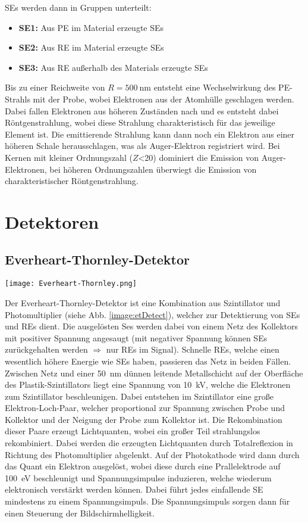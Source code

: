 SEs werden dann in Gruppen unterteilt:
\begin{itemize}
    \item \textbf{SE1:} Aus PE im Material erzeugte SEs
    \item \textbf{SE2:} Aus RE im Material erzeugte SEs 
    \item \textbf{SE3:} Aus RE außerhalb des Materials erzeugte SEs\\   
\end{itemize}

Bis zu einer Reichweite von $R=\SI{500}{\nano\metre}$ entsteht eine Wechselwirkung des PE-Strahls mit der Probe, wobei Elektronen aus der Atomhülle geschlagen werden. Dabei fallen Elektronen aus höheren Zuständen nach und es entsteht dabei Röntgenstrahlung, wobei diese Strahlung charakteristisch für das jeweilige Element ist. Die emittierende Strahlung kann dann noch ein Elektron aus einer höheren Schale herausschlagen, was als Auger-Elektron registriert wird. Bei Kernen mit kleiner Ordnungszahl ($Z$<20) dominiert die Emission von Auger-Elektronen, bei
höheren Ordnungszahlen überwiegt die Emission von charakteristischer Röntgenstrahlung.
\newpage
\section{Detektoren}
\label{sec:detect}

\subsection*{Everheart-Thornley-Detektor}
\label{sub:etDetect}
\begin{center}
    \texttt{[image: Everheart-Thornley.png]}
    \label{image:etDetect}
\end{center}
Der Everheart-Thornley-Detektor ist eine Kombination aus Szintillator und Photomultiplier (siehe Abb. \ref{image:etDetect}), welcher zur Detektierung von SEs und REs dient. Die ausgelösten Ses werden dabei von einem Netz des Kollektors mit positiver Spannung angesaugt (mit negativer Spannung können SEs zurückgehalten werden $\Rightarrow$ nur REs im Signal). Schnelle REs, welche einen wesentlich höhere Energie wie SEs haben, passieren das Netz in beiden Fällen. Zwischen Netz und einer \SI{50}{\nano\metre} dünnen leitende Metallschicht auf der Oberfläche des Plastik-Szintillators liegt eine Spannung von \SI{10} {\kilo\volt}, welche die Elektronen zum Szintillator beschleunigen. Dabei entstehen im Szintillator eine große Elektron-Loch-Paar, welcher proportional zur Spannung zwischen Probe und Kollektor und der Neigung der Probe zum Kollektor ist. Die Rekombination dieser Paare erzeugt Lichtquanten, wobei ein großer Teil strahlungslos rekombiniert. Dabei werden die erzeugten Lichtquanten durch Totalreflexion in Richtung des Photomultiplier abgelenkt. Auf der Photokathode wird dann durch das Quant ein Elektron ausgelöst, wobei diese durch eine Prallelektrode auf \SI{100}{\electronvolt} beschleunigt und Spannungsimpulse induzieren, welche wiederum elektronisch verstärkt werden können. Dabei führt jedes einfallende SE mindestens zu einem Spannungsimpuls. Die Spannungsimpuls sorgen dann für einen Steuerung der Bildschirmhelligkeit. \citep{RasterEM}
\newpage
